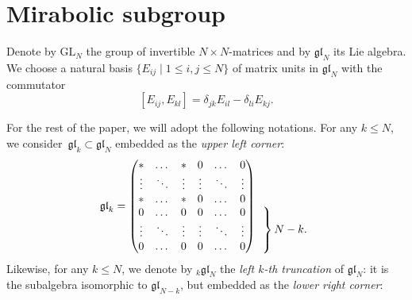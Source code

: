 \documentclass[10pt,a4paper]{article}
\numberwithin{equation}{section}
\newcommand{\GL}{\mathrm{GL}}
\newcommand{\gl}{\mathfrak{gl}}
\begin{document}
	\section{Mirabolic subgroup}
	\label{sect::mirabolic}
	
	Denote by $\GL_N$ the group of invertible $N\times N$-matrices and by $\gl_N$ its Lie algebra. We choose a natural basis $\{E_{ij} \mid 1 \leq i,j \leq N\}$ of matrix units in $\gl_N$ with the commutator
	\[
	[E_{ij}, E_{kl}] = \delta_{jk} E_{il} - \delta_{li} E_{kj}.
	\]
	
	For the rest of the paper, we will adopt the following notations. For any $k\leq N$, we consider~${\gl_k \subset \gl_N}$ embedded as the \emph{upper left corner}:
	\[
	\gl_k = \begin{pmatrix}
		* & \dots & * & 0 & \dots & 0 \\
		\vdots & \ddots & \vdots & \vdots & \ddots & \vdots \\
		* & \dots & * & 0 & \dots & 0 \\
		0 & \dots & 0 & 0 & \dots & 0 \\
		\vdots & \ddots & \vdots & \vdots & \ddots & \vdots \\
		0 & \dots & 0 & 0 & \dots & 0
	\end{pmatrix}
	\begin{array}{ c }
		\vphantom{\begin{array}{ c }
				b_N \\ %
				\vdots \\ %
				z_N %
		\end{array}} \\
		\left.\kern-\nulldelimiterspace
		\vphantom{\begin{array}{ c }
				b_N \\ %
				\vdots \\ %
				z_N %
		\end{array}}
		\right\}\text{$N-k.$}
	\end{array}
	\]
	Likewise, for any $k \leq N$, we denote by ${}_k \gl_N$ the \emph{left $k$-th truncation} of $\gl_N$: it is the subalgebra isomorphic to $\gl_{N-k}$, but embedded as the \emph{lower right corner}:
\end{document}
